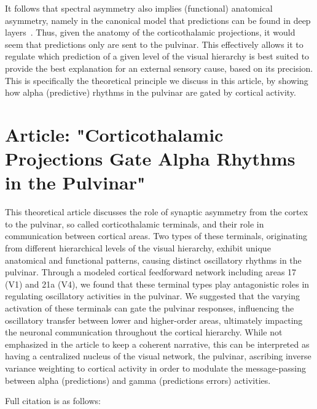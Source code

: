 It follows that spectral asymmetry also implies (functional) anatomical asymmetry, namely in the canonical model that predictions can be found in deep layers~\cite{bastos2012canonical}. Thus, given the anatomy of the corticothalamic projections, it would seem that predictions only are sent to the pulvinar. This effectively allows it to regulate which prediction of a given level of the visual hierarchy is best suited to provide the best explanation for an external sensory cause, based on its precision. This is specifically the theoretical principle we discuss in this article, by showing how alpha (predictive) rhythms in the pulvinar are gated by cortical activity.



\section{Article: "Corticothalamic Projections Gate Alpha Rhythms in the Pulvinar"}
This theoretical article discusses the role of synaptic asymmetry from the cortex to the pulvinar, so called corticothalamic terminals, and their role in communication between cortical areas. Two types of these terminals, originating from different hierarchical levels of the visual hierarchy, exhibit unique anatomical and functional patterns, causing distinct oscillatory rhythms in the pulvinar. Through a modeled cortical feedforward network including areas 17 (\gls{V1}) and 21a (V4), we found that these terminal types play antagonistic roles in regulating oscillatory activities in the pulvinar. We suggested that the varying activation of these terminals can gate the pulvinar responses, influencing the oscillatory transfer between lower and higher-order areas, ultimately impacting the neuronal communication throughout the cortical hierarchy. While not emphasized in the article to keep a coherent narrative, this can be interpreted as having a centralized nucleus of the visual network, the pulvinar, ascribing inverse variance weighting to cortical activity in order to modulate the message-passing between alpha (predictions) and gamma (predictions errors) activities. 

Full citation is as follows: 



